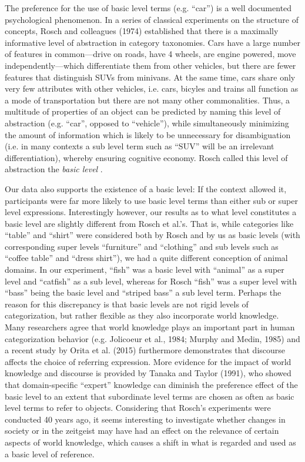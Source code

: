 \documentclass[10pt,letterpaper]{article}
\begin{document}
The preference for the use of basic level terms (e.g. ``car'') is a well documented psychological phenomenon. In a series of classical experiments on the structure of concepts, Rosch and colleagues (1974) established that there is a maximally informative level of abstraction in category taxonomies. Cars have a large number of features in common---drive on roads, have 4 wheels, are engine powered, move independently---which differentiate them from other vehicles, but there are fewer features that distinguish SUVs from minivans. At the same time, cars share only very few attributes with other vehicles, i.e. cars, bicyles and trains all function as a mode of transportation but there are not many other commonalities. Thus, a multitude of properties of an object can be predicted by naming this level of abstraction (e.g. ``car'', opposed to ``vehicle''), while simultaneously minimizing the amount of information which is likely to be unnecessary for disambiguation (i.e. in many contexts a sub level term such as ``SUV'' will be an irrelevant differentiation), whereby ensuring cognitive economy. Rosch called this level of abstraction the \emph{basic level} \cite{RoschEtAl76_BasicLevel}. 

Our data also supports the existence of a basic level: If the context allowed it, participants were far more likely to use basic level terms than either sub or super level expressions. Interestingly however, our results as to what level constitutes a basic level are slightly different from Rosch et al.'s. That is, while categories like ``table'' and ``shirt'' were considered both by Rosch and by us as basic levels (with corresponding super levels ``furniture'' and ``clothing'' and sub levels such as ``coffee table'' and ``dress shirt''), we had a quite different conception of animal domains. In our experiment, ``fish'' was a basic level with ``animal'' as a super level and ``catfish'' as a sub level, whereas for Rosch ``fish'' was a super level with ``bass'' being the basic level and ``striped bass'' a sub level term. Perhaps the reason for this discrepancy is that basic levels are not rigid levels of categorization, but rather flexible as they also incorporate world knowledge. Many researchers agree that world knowledge plays an important part in human categorization behavior (e.g. Jolicoeur et al., 1984; Murphy and Medin, 1985) and a recent study by Orita et al. (2015) furthermore demonstrates that discourse affects the choice of referring expression. More evidence for the impact of world knowledge and discourse is provided by Tanaka and Taylor (1991), who showed that domain-specific ``expert'' knowledge can diminish the preference effect of the basic level to an extent that subordinate level terms are chosen as often as basic level terms to refer to objects. Considering that Rosch's experiments were conducted 40 years ago, it seems interesting to investigate whether changes in society or in the zeitgeist may have had an effect on the relevance of certain aspects of world knowledge, which causes a shift in what is regarded and used as a basic level of reference.
\end{document}
